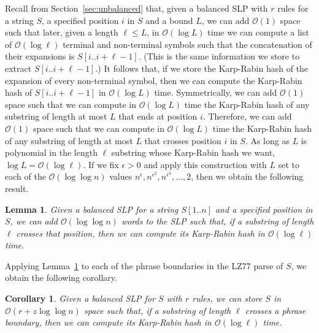 \documentclass[review]{elsarticle}
\newtheorem{lemma}[theorem]{Lemma}
\newtheorem{corollary}[theorem]{Corollary}
\newcommand{\Oh}[1]
    {\ensuremath{\mathcal{O}\!\left( {#1} \right)}}
\begin{document}
Recall from Section~\ref{sec:unbalanced} that, given a balanced SLP with $r$ rules for a string $S$, a specified position $i$ in $S$ and a bound $L$, we can add $\Oh{1}$ space such that later, given a length \(\ell \leq L\), in $\Oh{\log L}$ time we can compute a list of $\Oh{\log \ell}$ terminal and non-terminal symbols such that the concatenation of their expansions is \(S [i..i + \ell - 1]\).  (This is the same information we store to extract \(S [i..i + \ell - 1]\).)  It follows that, if we store the Karp-Rabin hash of the expansion of every non-terminal symbol, then we can compute the Karp-Rabin hash of \(S [i..i + \ell - 1]\) in $\Oh{\log L}$ time.  Symmetrically, we can add $\Oh{1}$ space such that we can compute in $\Oh{\log L}$ time the Karp-Rabin hash of any substring of length at most $L$ that ends at position $i$.  Therefore, we can add $\Oh{1}$ space such that we can compute in $\Oh{\log L}$ time the Karp-Rabin hash of any substring of length at most $L$ that crosses position $i$ in $S$.  As long as $L$ is polynomial in the length $\ell$ substring whose Karp-Rabin hash we want, \(\log L = \Oh{\log \ell}\).  If we fix \(\epsilon > 0\) and apply this construction with $L$ set to each of the $\Oh{\log \log n}$ values \(n^\epsilon, n^{\epsilon^2}, n^{\epsilon^3}, \ldots, 2\), then we obtain the following result.

\begin{lemma} \label{lem:hashes}
Given a balanced SLP for a string \(S [1..n]\) and a specified position in $S$, we can add $\Oh{\log \log n}$ words to the SLP such that, if a substring of length $\ell$ crosses that position, then we can compute its Karp-Rabin hash in $\Oh{\log \ell}$ time.
\end{lemma}

Applying Lemma~\ref{lem:hashes} to each of the phrase boundaries in the LZ77 parse of $S$, we obtain the following corollary.

\begin{corollary} \label{cor:hashes}
Given a balanced SLP for $S$ with $r$ rules, we can store $S$ in $\Oh{r + z \log \log n}$ space such that, if a substring of length $\ell$ crosses a phrase boundary, then we can compute its Karp-Rabin hash in $\Oh{\log \ell}$ time.
\end{corollary}
\end{document}
